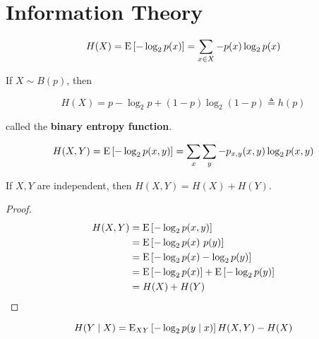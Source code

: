 \chapter{Information Theory}

\begin{definition}[Entropy]

  \begin{displaymath}
    H(X) = \operatorname{\mathrm{E}}\left[-\log_2 p(x)\right] = \sum_{x \in X} -p(x) \log_2 p(x)
  \end{displaymath}

  If $X \sim B(p)$, then

  \begin{displaymath}
    H(X) = p -\log_2 p + (1 - p) \log_2 (1 - p) \triangleq h(p)
  \end{displaymath}

  called the \textbf{binary entropy function}.

\end{definition}

\begin{definition}
  
  \begin{displaymath}
    H(X,Y) = \operatorname{\mathrm{E}}\left[-\log_2 p(x,y)\right] = \sum_{x} \sum_{y} -p_{x,y}(x,y) \log_2 p(x,y)
  \end{displaymath}

  If $X,Y$ are independent, then $H(X,Y) = H(X) + H(Y)$.

  \begin{proof}
    
    \begin{align*}
      H(X,Y) &= \operatorname{\mathrm{E}}\left[-\log_2 p(x,y)\right] \\
             &= \operatorname{\mathrm{E}}\left[-\log_2 p(x)\ p(y)\right] \\
             &= \operatorname{\mathrm{E}}\left[-\log_2 p(x) -\log_2 p(y)\right] \\
             &= \operatorname{\mathrm{E}}\left[-\log_2 p(x)\right] + \operatorname{\mathrm{E}}\left[-\log_2 p(y)\right] \\
             &= H(X) + H(Y)
    \end{align*}
    
  \end{proof}
  
\end{definition}

\begin{definition}
  
  \begin{displaymath}
    H(Y \mid X) = \operatorname{\mathrm{E}}_{XY}\left[-\log_2 p(y \mid x)\right] H(X,Y) - H(X)
  \end{displaymath}
  
\end{definition}


